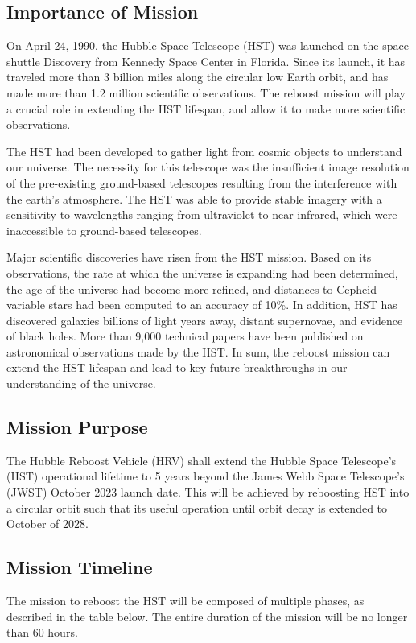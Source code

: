 \documentclass[paper=letter, fontsize=11pt]{scrartcl} %
\numberwithin{equation}{section} %
\numberwithin{figure}{section} %
\numberwithin{table}{section} %
\begin{document}
\subsection{Importance of Mission}
On April 24, 1990, the Hubble Space Telescope (HST) was launched on the space shuttle Discovery from Kennedy Space Center in Florida. Since its launch, it has traveled more than 3 billion miles along the circular low Earth orbit, and has made more than 1.2 million scientific observations. The reboost mission will play a crucial role in extending the HST lifespan, and allow it to make more scientific observations.

\par The HST had been developed to gather light from cosmic objects to understand our universe. The necessity for this telescope was the insufficient image resolution of the pre-existing ground-based telescopes resulting from the interference with the earth's atmosphere. The HST was able to provide stable imagery with a sensitivity to wavelengths ranging from ultraviolet to near infrared, which were inaccessible to ground-based telescopes.

\par Major scientific discoveries have risen from the HST mission. Based on its observations, the rate at which the universe is expanding had been determined, the age of the universe had become more refined, and distances to Cepheid variable stars had been computed to an accuracy of 10\%. In addition, HST has discovered galaxies billions of light years away, distant supernovae, and evidence of black holes. More than 9,000 technical papers have been published on astronomical observations made by the HST. In sum, the reboost mission can extend the HST lifespan and lead to key future breakthroughs in our understanding of the universe.

\subsection{Mission Purpose}
The Hubble Reboost Vehicle (HRV) shall extend the Hubble Space Telescope's (HST) operational lifetime to 5 years beyond the James Webb Space Telescope's (JWST) October 2023 launch date. This will be achieved by reboosting HST into a circular orbit such that its useful operation until orbit decay is extended to October of 2028.

\subsection{Mission Timeline}
The mission to reboost the HST will be composed of multiple phases, as described in the table below. The entire duration of the mission will be no longer than 60 hours.
\end{document}
